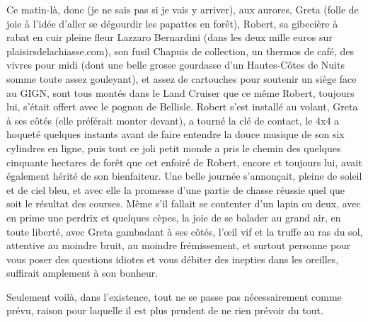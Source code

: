 \illusloflabel{}%
Ce matin-là, donc (je ne sais pas si je vais y arriver), aux aurores, Greta (folle de joie à l’idée d’aller se dégourdir les papattes en forêt), Robert, sa gibecière à rabat en cuir pleine fleur Lazzaro Bernardini (dans les deux mille euros sur plaisirsdelachiasse.com), son fusil Chapuis de collection, un thermos de café, des vivres pour midi (dont une belle grosse gourdasse d’un Hautes-Côtes de Nuits somme toute assez gouleyant), et assez de cartouches pour soutenir un siège face au GIGN, sont tous montés dans le Land Cruiser que ce même Robert, toujours lui, s’était offert avec le pognon de Bellisle. Robert s’est installé au volant, Greta à ses côtés (elle préférait monter devant), a tourné la clé de contact, le 4x4 a hoqueté quelques instants avant de faire entendre la douce musique de son six cylindres en ligne, puis tout ce joli petit monde a pris le chemin des quelques cinquante hectares de forêt que cet enfoiré de Robert, encore et toujours lui, avait également hérité de son bienfaiteur. Une belle journée s’annonçait, pleine de soleil et de ciel bleu, et avec elle la promesse d’une partie de chasse réussie quel que soit le résultat des courses. Même s’il fallait se contenter d’un lapin ou deux, avec en prime une perdrix et quelques cèpes, la joie de se balader au grand air, en toute liberté, avec Greta gambadant à ses côtés, l’œil vif et la truffe au ras du sol, attentive au moindre bruit, au moindre frémissement, et surtout personne pour vous poser des questions idiotes et vous débiter des inepties dans les oreilles, suffirait amplement à son bonheur.

Seulement voilà, dans l’existence, tout ne se passe pas nécessairement comme prévu, raison pour laquelle il est plus prudent de ne rien prévoir du tout.

